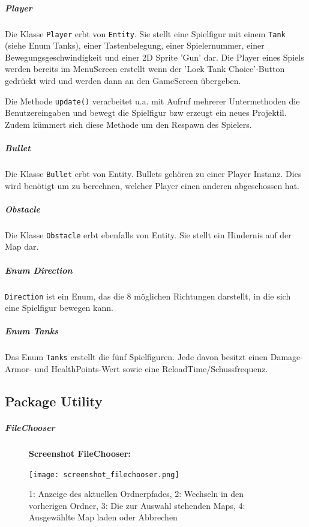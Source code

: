 \documentclass[a4paper]{scrreprt}
\def\code#1{\texttt{#1}}
\begin{document}
\subparagraph{Player}
Die Klasse \code{Player} erbt von \code{Entity}. Sie stellt eine Spielfigur mit einem \code{Tank} (siehe Enum Tanks), einer Tastenbelegung, einer Spielernummer, einer Bewegungsgeschwindigkeit und einer 2D Sprite 'Gun' dar. Die Player eines Spiels werden bereits im MenuScreen erstellt wenn der 'Lock Tank Choice'-Button gedrückt wird und werden dann an den GameScreen übergeben.

Die Methode \code{update()} verarbeitet u.a. mit Aufruf mehrerer Untermethoden die Benutzereingaben und bewegt die Spielfigur bzw erzeugt ein neues Projektil. Zudem kümmert sich diese Methode um den Respawn des Spielers.
\subparagraph{Bullet}
Die Klasse \code{Bullet} erbt von Entity. Bullets gehören zu einer Player Instanz. Dies wird benötigt um zu berechnen, welcher Player einen anderen abgeschossen hat.
\subparagraph{Obstacle}
Die Klasse \code{Obstacle} erbt ebenfalls von Entity. Sie stellt ein Hindernis auf der Map dar.
\subparagraph{Enum Direction}
\code{Direction} ist ein Enum, das die 8 möglichen Richtungen darstellt, in die sich eine Spielfigur bewegen kann.

\subparagraph{Enum Tanks}
Das Enum \code{Tanks} erstellt die fünf Spielfiguren. Jede davon besitzt einen Damage- Armor- und HealthPoints-Wert sowie eine ReloadTime/Schussfrequenz. 

\newpage
\subsection{Package Utility}
\subparagraph{FileChooser}
\begin{figure}[H]
  \textbf{Screenshot FileChooser:}\par\medskip
  \centering
\texttt{[image: screenshot\_filechooser.png]}  
\caption{1: Anzeige des aktuellen Ordnerpfades, 2: Wechseln in den vorherigen Ordner, 3: Die zur Auswahl stehenden Maps, 4: Ausgewählte Map laden oder Abbrechen}
\end{figure}
\end{document}
